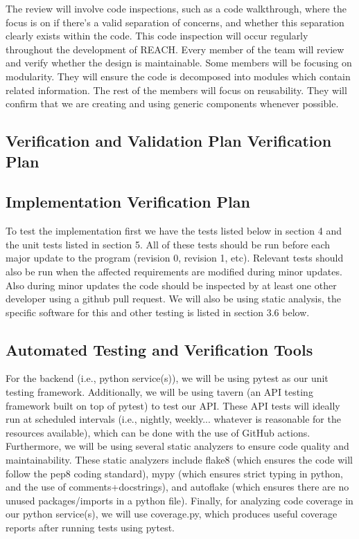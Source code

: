 \documentclass[12pt, titlepage]{article}
\begin{document}
The review will involve code inspections, such as a code walkthrough, where the focus is on if 
there's a valid separation of concerns, and whether this separation clearly exists within the 
code. This code inspection will occur regularly throughout the development of REACH. Every member 
of the team will review and verify whether the design is maintainable. Some members will be 
focusing on modularity. They will ensure the code is decomposed into modules which contain 
related information. The rest of the members will focus on reusability. They will confirm that 
we are creating and using generic components whenever possible.

\subsection{Verification and Validation Plan Verification Plan}




\subsection{Implementation Verification Plan}

To test the implementation first we have the tests listed below in section 4 and the unit tests listed in section 5. 
All of these tests should be run before each major update to the program (revision 0, revision 1, etc). Relevant tests should
also be run when the affected requirements are modified during minor updates. Also during minor updates the code should be 
inspected by at least one other developer using a github pull request. We will also be using static analysis, the specific 
software for this and other testing is listed in section 3.6 below.

\subsection{Automated Testing and Verification Tools}

For the backend (i.e., python service(s)), we will be using pytest as our unit testing framework. Additionally,
we will be using tavern (an API testing framework built on top of pytest) to test our API. These API tests will
ideally run at scheduled intervals (i.e., nightly, weekly... whatever is reasonable for the resources available), which can be 
done with the use of GitHub actions. Furthermore, we will be using several static analyzers to ensure code quality and maintainability. These 
static analyzers include flake8 (which ensures the code will follow the pep8 coding standard), mypy (which ensures strict typing in python,
and the use of comments+docstrings), and autoflake (which ensures there are no unused packages/imports in a python file). Finally, for analyzing 
code coverage in our python service(s), we will use coverage.py, which produces useful coverage reports after running tests using pytest.\\
\end{document}
